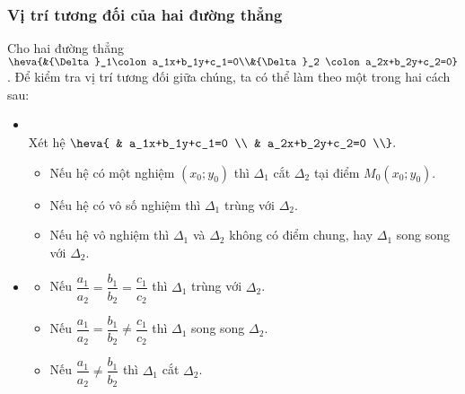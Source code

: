 \subsubsection{ Vị trí tương đối của hai đường thẳng}
Cho hai đường thẳng $\heva{&{\Delta}_1\colon a_1x+b_1y+c_1=0\\&{\Delta}_2 \colon a_2x+b_2y+c_2=0}$. Để kiểm tra vị trí tương đối giữa chúng, ta có thể làm theo một trong hai cách sau:
\begin{itemize}
	\item [\iconMT] \\
	Xét hệ $\heva{
		& a_1x+b_1y+c_1=0 \\ 
		& a_2x+b_2y+c_2=0 \\}.$
	\begin{boxkn}
		\begin{itemize}
			\item Nếu hệ có một nghiệm $\left(x_0;y_0\right)$ thì ${\Delta}_1$ cắt ${\Delta}_2$ tại điểm $M_0\left(x_0;y_0\right).$
			\item Nếu hệ có vô số nghiệm thì ${\Delta}_1$ trùng với ${\Delta}_2$.
			\item Nếu hệ vô nghiệm thì ${\Delta}_1$ và ${\Delta}_2$ không có điểm chung, hay ${\Delta}_1$ song song với ${\Delta}_2$.
		\end{itemize}
	\end{boxkn}
	\item [\iconMT] 
	\begin{boxkn}
		\begin{itemize}
			\item Nếu $\dfrac{a_1}{a_2}=\dfrac{b_1}{b_2}=\dfrac{c_1}{c_2}$ thì ${\Delta}_1$ trùng với ${\Delta}_2$.
			\item Nếu $\dfrac{a_1}{a_2}=\dfrac{b_1}{b_2}\ne \dfrac{c_1}{c_2}$ thì ${\Delta}_1$ song song ${\Delta}_2$.
			\item  Nếu $\dfrac{a_1}{a_2}\ne \dfrac{b_1}{b_2}$ thì ${\Delta}_1$ cắt ${\Delta}_2$.
		\end{itemize}
	\end{boxkn}
\end{itemize}

